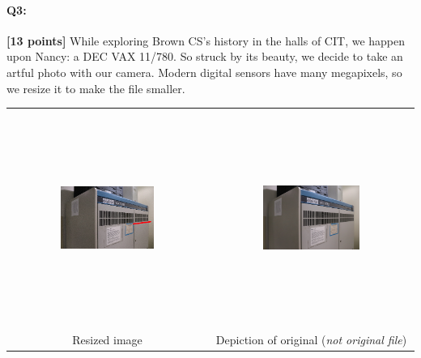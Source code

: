 \documentclass[11pt]{article}
\begin{document}

\pagebreak

\paragraph{Q3:} \textbf{[13 points]} While exploring Brown CS's history in the halls of CIT, we happen upon Nancy: a DEC VAX 11/780. So struck by its beauty, we decide to take an artful photo with our camera. Modern digital sensors have many megapixels, so we resize it to make the file smaller.

\begin{tabular}{c c}
\includegraphics[width=0.49\textwidth,height=7cm,keepaspectratio]{images/poor_nancy_markup.png} &
\includegraphics[width=0.49\textwidth,height=7cm,keepaspectratio]{images/poor_nancy_better.png} \\
Resized image & Depiction of original (\emph{not original file})
\end{tabular}

\end{document}
